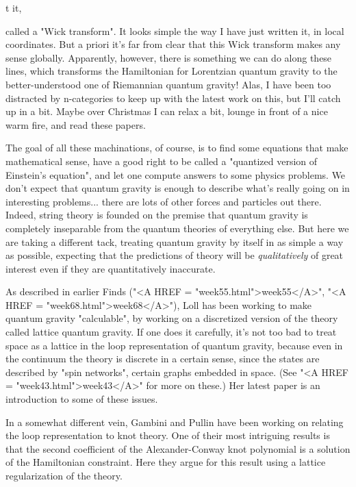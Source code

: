                          t \to  it,

called a "Wick transform".  It looks simple the way I have
just written it, in local coordinates.  But a priori it's far from
clear that this Wick transform makes any sense globally.  Apparently,
however, there is something we can do along these lines, which
transforms the Hamiltonian for Lorentzian quantum gravity to the
better-understood one of Riemannian quantum gravity!  Alas, I have
been too distracted by n-categories to keep up with the latest work on
this, but I'll catch up in a bit.  Maybe over Christmas I can relax a
bit, lounge in front of a nice warm fire, and read these papers.

The goal of all these machinations, of course, is to find some
equations that make mathematical sense, have a good right to be called
a "quantized version of Einstein's equation", and let one
compute answers to some physics problems.  We don't expect that
quantum gravity is enough to describe what's really going on in
interesting problems...  there are lots of other forces and particles
out there.  Indeed, string theory is founded on the premise that
quantum gravity is completely inseparable from the quantum theories of
everything else.  But here we are taking a different tack, treating
quantum gravity by itself in as simple a way as possible, expecting
that the predictions of theory will be \emph{qualitatively} of great
interest even if they are quantitatively inaccurate.

As described in earlier Finds ("<A HREF = "week55.html">week55</A>", "<A HREF = "week68.html">week68</A>"), Loll has been
working to make quantum gravity "calculable", by working on a
discretized version of the theory called lattice quantum gravity.
If one does it carefully, it's not too bad to treat space as a lattice
in the loop representation of quantum gravity, because even in the
continuum the theory is discrete in a certain sense, since the states
are described by "spin networks", certain graphs embedded in space.
(See "<A HREF = "week43.html">week43</A>" for more on these.)  Her latest paper is an introduction
to some of these issues.  

In a somewhat different vein, Gambini and Pullin have been working on
relating the loop representation to knot theory.  One of their most
intriguing results is that the second coefficient of the
Alexander-Conway knot polynomial is a solution of the Hamiltonian
constraint.  Here they argue for this result using a lattice
regularization of the theory.

